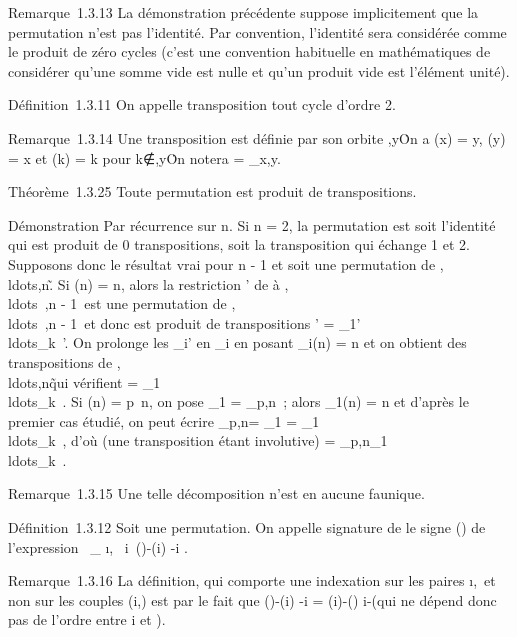 \documentclass[]{article}
\begin{document}
Remarque~1.3.13 La démonstration précédente suppose implicitement que la
permutation n'est pas l'identité. Par convention, l'identité sera
considérée comme le produit de zéro cycles (c'est une convention
habituelle en mathématiques de considérer qu'une somme vide est nulle et
qu'un produit vide est l'élément unité).

Définition~1.3.11 On appelle transposition tout cycle d'ordre 2.

Remarque~1.3.14 Une transposition est définie par son orbite
\x,y\. On a \sigma(x) = y, \sigma(y) = x et \sigma(k)
= k pour
k∉\x,y\. On
notera \sigma = \tau\_x,y.

Théorème~1.3.25 Toute permutation est produit de transpositions.

Démonstration Par récurrence sur n. Si n = 2, la permutation est soit
l'identité qui est produit de 0 transpositions, soit la transposition
qui échange 1 et 2. Supposons donc le résultat vrai pour n - 1 et soit \sigma
une permutation de
\1,\\ldots,n\~.
Si \sigma(n) = n, alors la restriction \sigma' de \sigma à
\1,\\ldots~,n
- 1\ est une permutation de
\1,\\ldots~,n
- 1\, et donc est produit de transpositions \sigma' =
\tau\_1'\\ldots\tau\_k~'.
On prolonge les \tau\_i' en \tau\_i en posant \tau\_i(n)
= n et on obtient des transpositions de
\1,\\ldots,n\~
qui vérifient \sigma =
\tau\_1\\ldots\tau\_k~.
Si \sigma(n) = p\neq~n, on pose \sigma\_1 =
\tau\_p,n\sigma~; alors \sigma\_1(n) = n et d'après le premier cas
étudié, on peut écrire \tau\_p,n\sigma = \sigma\_1 =
\tau\_1\\ldots\tau\_k~,
d'où (une transposition étant involutive) \sigma =
\tau\_p,n\tau\_1\\ldots\tau\_k~.

Remarque~1.3.15 Une telle décomposition n'est en aucune
fa\ccon unique.

Définition~1.3.12 Soit \sigma une permutation. On appelle signature de \sigma le
signe \epsilon(\sigma) de l'expression
\∏  ~\_
\i,\jmath\ \atop
i\neq~\jmath  \sigma(\jmath)-\sigma(i) \over
\jmath-i .

Remarque~1.3.16 La définition, qui comporte une indexation sur les
paires \i,\jmath\ et non sur les couples
(i,\jmath) est  par le fait que  \sigma(\jmath)-\sigma(i) \over
\jmath-i = \sigma(i)-\sigma(\jmath) \over i-\jmath (qui ne dépend donc pas
de l'ordre entre i et \jmath).
\end{document}
